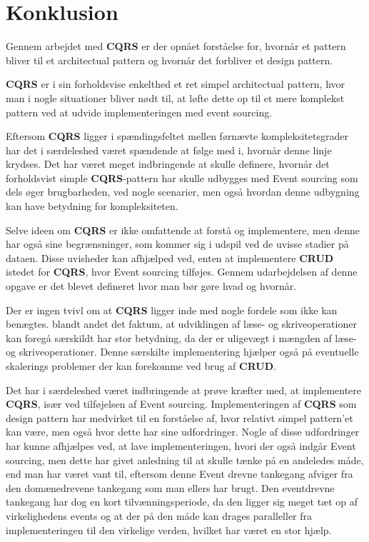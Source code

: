 \chapter{Konklusion}
Gennem arbejdet med \textbf{CQRS} er der opnået forståelse for, hvornår et pattern bliver til et architectual pattern og hvornår det forbliver et design pattern.

\textbf{CQRS} er i sin forholdsvise enkelthed et ret simpel architectual pattern, hvor man i nogle situationer bliver nødt til, at løfte dette op til et mere komplekst pattern ved at udvide implementeringen med event sourcing.\newline

Eftersom \textbf{CQRS} ligger i spændingsfeltet mellen førnævte kompleksitetsgrader har det i særdeleshed været spændende at følge med i, hvornår denne linje krydses. Det har været meget indbringende at skulle definere, hvornår det forholdsvist simple \textbf{CQRS}-pattern har skulle udbygges med Event sourcing som dels øger brugbarheden, ved nogle scenarier, men også hvordan denne udbygning kan have betydning for kompleksiteten.\newline

Selve ideen om \textbf{CQRS} er ikke omfattende at forstå og implementere, men denne har også sine begrænsninger, som kommer sig i udspil ved de uvisse stadier på dataen. Disse uvisheder kan afhjælped ved, enten at implementere \textbf{CRUD} istedet for \textbf{CQRS}, hvor Event sourcing tilføjes. Gennem udarbejdelsen af denne opgave er det blevet defineret hvor man bør gøre hvad og hvornår. \newline

Der er ingen tvivl om at \textbf{CQRS} ligger inde med nogle fordele som ikke kan benægtes. blandt andet det faktum, at udviklingen af læse- og skriveoperationer kan foregå særskildt har stor betydning, da der er uligevægt i mængden af læse- og skriveoperationer. Denne særskilte implementering hjælper også på eventuelle skalerings problemer der kan forekomme ved brug af \textbf{CRUD}.\newline 

Det har i særdeleshed været indbringende at prøve kræfter med, at implementere \textbf{CQRS}, især ved tilføjelsen af Event sourcing. Implementeringen af \textbf{CQRS} som design pattern har medvirket til en forståelse af, hvor relativt simpel pattern'et kan være, men også hvor dette har sine udfordringer. Nogle af disse udfordringer har kunne afhjælpes ved, at lave implementeringen, hvori der også indgår Event sourcing, men dette har givet anledning til at skulle tænke på en andeledes måde, end man har været vant til, eftersom denne Event drevne tankegang afviger fra den domænedrevene tankegang som man ellers har brugt. 
Den eventdrevne tankegang har dog en kort tilvænningsperiode, da den ligger sig meget tæt op af virkelighedens events og at der på den måde kan drages paralleller fra implementeringen til den virkelige verden, hvilket har været en stor hjælp. 

